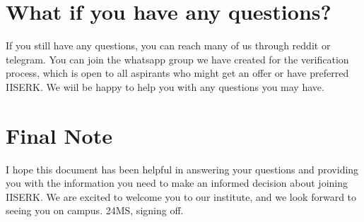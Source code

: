 \documentclass[openany]{book}
\begin{document}
\section{What if you have any questions?}
If you still have any questions, you can reach many of us through reddit or telegram. You can join the whatsapp group we have created for the verification process, which is open to all aspirants who might get an offer or have preferred IISERK. We wiil be happy to help you with any questions you may have. \\
\section{Final Note}
I hope this document has been helpful in answering your questions and providing you with the information you need to make an informed decision about joining IISERK. We are excited to welcome you to our institute, and we look forward to seeing you on campus. 24MS, signing off. 
\end{document}
